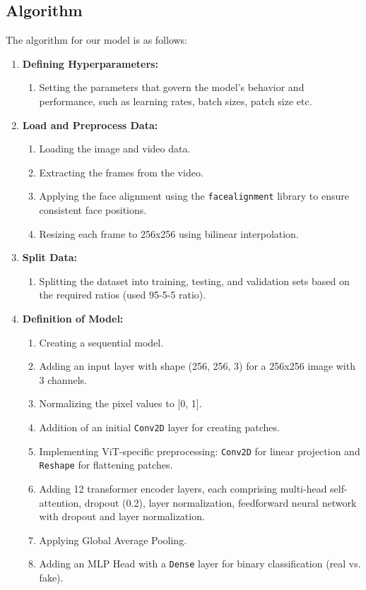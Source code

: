 \subsection{Algorithm}
The algorithm  for our model is as follows:

\begin{enumerate}
   \item \textbf{Defining Hyperparameters:}
         \begin{enumerate}
            \item  Setting the parameters that govern the model's behavior and performance, such as learning rates, batch sizes, patch size etc.
         \end{enumerate}

   \item \textbf{Load and Preprocess Data:}
         \begin{enumerate}
            \item Loading the image and video data.
            \item Extracting the frames from the video.
            \item Applying the face alignment using the \texttt{facealignment} library to ensure consistent face positions.
            \item Resizing each frame to 256x256 using bilinear interpolation.
         \end{enumerate}

   \item \textbf{Split Data:}
         \begin{enumerate}
            \item Splitting the dataset into training, testing, and validation sets based on the required ratios (used 95-5-5 ratio).
         \end{enumerate}

   \item \textbf{Definition of Model:}
         \begin{enumerate}
            \item Creating a sequential model.
            \item Adding an input layer with shape (256, 256, 3) for a 256x256 image with 3 channels.
            \item Normalizing the pixel values to [0, 1].
            \item Addition of an initial \texttt{Conv2D} layer for creating patches.
            \item Implementing ViT-specific preprocessing: \texttt{Conv2D} for linear projection and \texttt{Reshape} for flattening patches.
            \item Adding 12 transformer encoder layers, each comprising multi-head self-attention, dropout (0.2), layer normalization, feedforward neural network with dropout and layer normalization.
            \item Applying Global Average Pooling.
            \item Adding an MLP Head with a \texttt{Dense} layer for binary classification (real vs. fake).
         \end{enumerate}


\end{enumerate}
